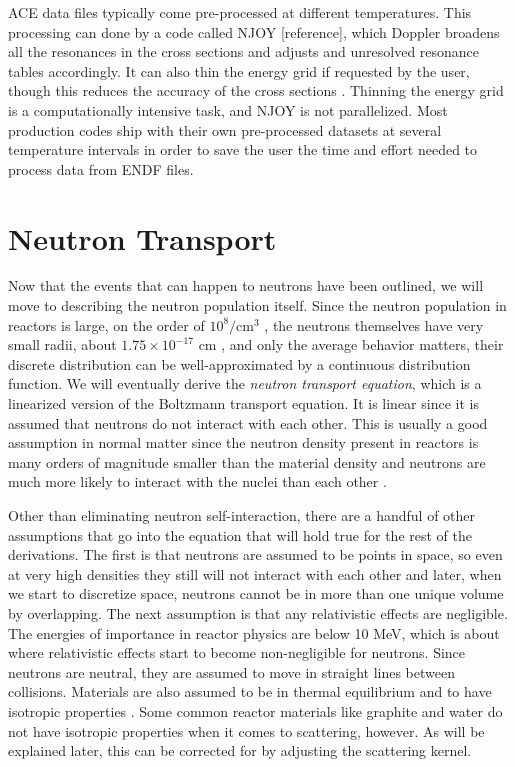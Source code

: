 ACE data files typically come pre-processed at different temperatures.  This processing can done by a code called NJOY [reference], which Doppler broadens all the resonances in the cross sections and adjusts and unresolved resonance tables accordingly.  It can also thin the energy grid if requested by the user, though this reduces the accuracy of the cross sections \cite{jaakko}.  Thinning the energy grid is a computationally intensive task, and NJOY is not parallelized.  Most production codes ship with their own pre-processed datasets at several temperature intervals in order to save the user the time and effort needed to process data from ENDF files.


\section{Neutron Transport}

Now that the events that can happen to neutrons have been outlined, we will move to describing the neutron population itself.  Since the neutron population in reactors is large, on the order of $10^{8}/\mathrm{cm}^3$ \cite{duderstadt}, the neutrons themselves have very small radii, about $1.75\times10^{-17}$ cm \cite{krane}, and only the average behavior matters, their discrete distribution can be well-approximated by a continuous distribution function.  We will eventually derive the \emph{neutron transport equation}, which is a linearized version of the Boltzmann transport equation.  It is linear since it is assumed that neutrons do not interact with each other.  This is usually a good assumption in normal matter since the neutron density present in reactors is many orders of magnitude smaller than the material density and neutrons are much more likely to interact with the nuclei than each other \cite{duderstadt}.  

Other than eliminating neutron self-interaction, there are a handful of other assumptions that go into the equation that will hold true for the rest of the derivations.  The first is that neutrons are assumed to be points in space, so even at very high densities they still will not interact with each other and later, when we start to discretize space, neutrons cannot be in more than one unique volume by overlapping.  The next assumption is that any relativistic effects are negligible.  The energies of importance in reactor physics are below 10 MeV, which is about where relativistic effects start to become non-negligible for neutrons.  Since neutrons are neutral, they are assumed to move in straight lines between collisions.  Materials are also assumed to be in thermal equilibrium and to have isotropic properties \cite{duderstadt}.  Some common reactor materials like graphite and water do not have isotropic properties when it comes to scattering, however.  As will be explained later, this can be corrected for by adjusting the scattering kernel.

